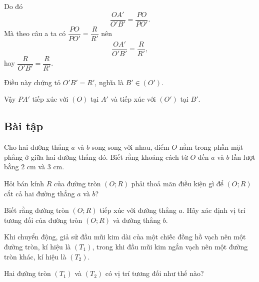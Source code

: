 \begin{exercises}
\begin{enumerate}[label=\alph*)]
        Do đó
        \[
            \dfrac{OA'}{O'B'}=\dfrac{PO}{PO'}.
        \]
        Mà theo câu a ta có $\dfrac{PO}{PO'}=\dfrac{R}{R'}$ nên
        \[
            \dfrac{OA'}{O'B'}=\dfrac{R}{R'},
        \]
        hay $\dfrac{R}{O'B'}=\dfrac{R}{R'}$.

        Điều này chứng tỏ $O'B'=R'$, nghĩa là $B'\in (O')$.

        Vậy $PA'$ tiếp xúc với $(O)$ tại $A'$ và tiếp xúc với $(O')$ tại $B'$.
    \end{enumerate}

    \subsection{Bài tập}

    \begin{questions}[resume=SGK]
        \item Cho hai đường thẳng $a$ và $b$ song song với nhau, điểm $O$ nằm trong phần mặt phẳng ở giữa hai đường thẳng đó. Biết rằng khoảng cách từ $O$ đến $a$ và $b$ lần lượt bằng $2$ cm và $3$ cm.
        \begin{questions}
            \item Hỏi bán kính $R$ của đường tròn $(O; R)$ phải thoả mãn điều kiện gì để $(O; R)$ cắt cả hai đường thẳng $a$ và $b$?

            \answerline
            \answerline

            \item Biết rằng đường tròn $(O; R)$ tiếp xúc với đường thẳng $a$. Hãy xác định vị trí tương đối của đường tròn $(O; R)$ và đường thẳng $b$.

            \answerline
            \answerline
        \end{questions}

        \item Khi chuyển động, giả sử đầu mũi kim dài của một chiếc đồng hồ vạch nên một đường tròn, kí hiệu là $(T_1)$, trong khi đầu mũi kim ngắn vạch nên một đường tròn khác, kí hiệu là $(T_2)$.


        \begin{questions}
            \item Hai đường tròn $(T_1)$ và $(T_2)$ có vị trí tương đối như thế nào?

            \answerline


\end{questions}
\end{questions}
\end{exercises}
